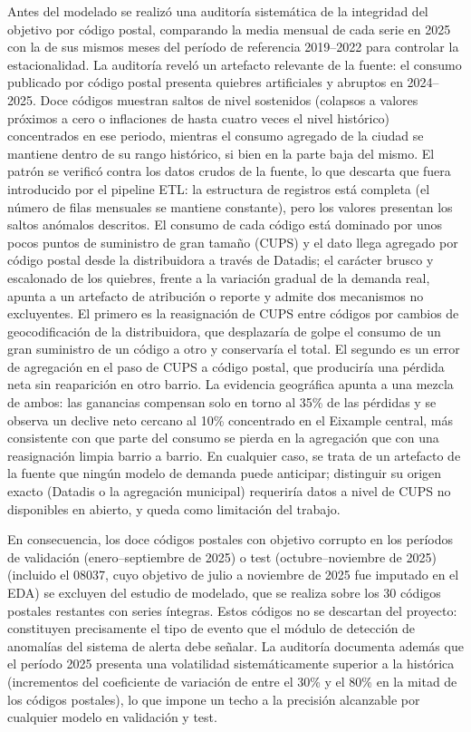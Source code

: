 \documentclass[12pt, a4paper]{article}
\begin{document}
Antes del modelado se realizó una auditoría sistemática de la integridad del objetivo por código postal, comparando la media mensual de cada serie en 2025 con la de sus mismos meses del período de referencia 2019--2022 para controlar la estacionalidad. La auditoría reveló un artefacto relevante de la fuente: el consumo publicado por código postal presenta quiebres artificiales y abruptos en 2024--2025. Doce códigos muestran saltos de nivel sostenidos (colapsos a valores próximos a cero o inflaciones de hasta cuatro veces el nivel histórico) concentrados en ese periodo, mientras el consumo agregado de la ciudad se mantiene dentro de su rango histórico, si bien en la parte baja del mismo. El patrón se verificó contra los datos crudos de la fuente, lo que descarta que fuera introducido por el pipeline ETL: la estructura de registros está completa (el número de filas mensuales se mantiene constante), pero los valores presentan los saltos anómalos descritos. El consumo de cada código está dominado por unos pocos puntos de suministro de gran tamaño (CUPS) y el dato llega agregado por código postal desde la distribuidora a través de Datadis; el carácter brusco y escalonado de los quiebres, frente a la variación gradual de la demanda real, apunta a un artefacto de atribución o reporte y admite dos mecanismos no excluyentes. El primero es la reasignación de CUPS entre códigos por cambios de geocodificación de la distribuidora, que desplazaría de golpe el consumo de un gran suministro de un código a otro y conservaría el total. El segundo es un error de agregación en el paso de CUPS a código postal, que produciría una pérdida neta sin reaparición en otro barrio. La evidencia geográfica apunta a una mezcla de ambos: las ganancias compensan solo en torno al 35\% de las pérdidas y se observa un declive neto cercano al 10\% concentrado en el Eixample central, más consistente con que parte del consumo se pierda en la agregación que con una reasignación limpia barrio a barrio. En cualquier caso, se trata de un artefacto de la fuente que ningún modelo de demanda puede anticipar; distinguir su origen exacto (Datadis o la agregación municipal) requeriría datos a nivel de CUPS no disponibles en abierto, y queda como limitación del trabajo.

En consecuencia, los doce códigos postales con objetivo corrupto en los períodos de validación (enero--septiembre de 2025) o test (octubre--noviembre de 2025) (incluido el 08037, cuyo objetivo de julio a noviembre de 2025 fue imputado en el EDA) se excluyen del estudio de modelado, que se realiza sobre los 30 códigos postales restantes con series íntegras. Estos códigos no se descartan del proyecto: constituyen precisamente el tipo de evento que el módulo de detección de anomalías del sistema de alerta debe señalar. La auditoría documenta además que el período 2025 presenta una volatilidad sistemáticamente superior a la histórica (incrementos del coeficiente de variación de entre el 30\% y el 80\% en la mitad de los códigos postales), lo que impone un techo a la precisión alcanzable por cualquier modelo en validación y test.
\end{document}
